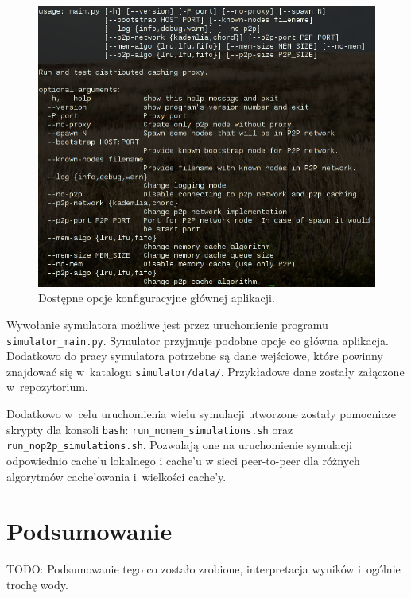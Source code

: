 \documentclass[a4paper,11pt]{scrartcl}
\newcommand{\f}{\texttt}
\newcommand{\s}{ }
\newcommand{\keszy}{cache'y}
\newcommand{\keszu}{cache'u}
\newcommand{\keszowania}{cache'owania}
\begin{document}
\begin{figure}[h]
\centering
\includegraphics[width=0.8\linewidth]{img/options.png}
\caption{Dostępne opcje konfiguracyjne głównej aplikacji.}
\label{fig_main_help}
\end{figure}

Wywołanie symulatora możliwe jest przez uruchomienie programu \f{simulator\_main.py}. Symulator przyjmuje podobne opcje co główna aplikacja. Dodatkowo do pracy symulatora potrzebne są dane wejściowe, które powinny znajdować się w~katalogu \f{simulator/data/}. Przykładowe dane zostały załączone w~repozytorium.

Dodatkowo w~celu uruchomienia wielu symulacji utworzone zostały pomocnicze skrypty dla konsoli \f{bash}: \f{run\_nomem\_simulations.sh} oraz \f{run\_nop2p\_simulations.sh}. Pozwalają one na uruchomienie symulacji odpowiednio \keszu\s lokalnego i \keszu\s w sieci peer-to-peer dla różnych algorytmów \keszowania\s i~wielkości \keszy.


\section{Podsumowanie}

TODO: Podsumowanie tego co zostało zrobione, interpretacja wyników i~ogólnie trochę wody.




\end{document}
